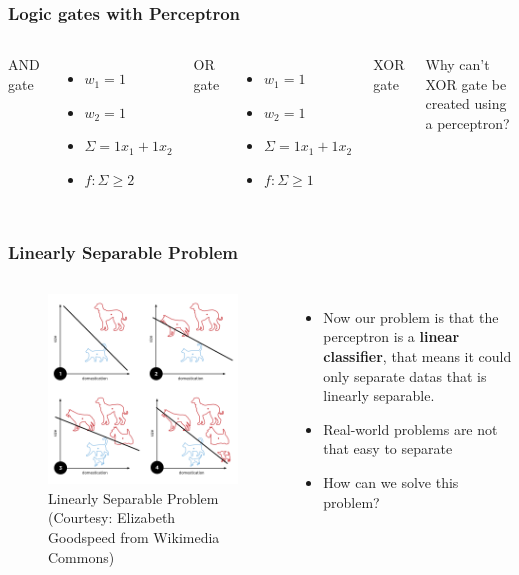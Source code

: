 \documentclass[aspectratio=169]{beamer}
\begin{document}
\begin{frame}
	\frametitle{Logic gates with Perceptron}
	\begin{columns}[t]
		{\large AND gate}

		\begin{itemize}
			\item $w_1 = 1$
			\item $w_2 = 1$
			\item $\Sigma = 1x_1 + 1x_2$
			\item $f: \Sigma \geq 2$
		\end{itemize}
		{\large OR gate}

		\begin{itemize}
			\item $w_1 = 1$
			\item $w_2 = 1$
			\item $\Sigma = 1x_1 + 1x_2$
			\item $f: \Sigma \geq 1$
		\end{itemize}
		{\large XOR gate}

		Why can't XOR gate be created using a perceptron?
	\end{columns}
\end{frame}

\begin{frame}
	\frametitle{Linearly Separable Problem}
	\begin{columns}
		\begin{figure}
			\includegraphics[width=0.7\linewidth,height=0.7\textheight,keepaspectratio]{imgs/linsep.png}
			\caption{Linearly Separable Problem (Courtesy: Elizabeth Goodspeed from Wikimedia Commons)}
		\end{figure}
		\begin{itemize}
			\item Now our problem is that the perceptron is a \textbf{linear classifier}, that means it could only separate datas that is linearly separable.
			\item Real-world problems are not that easy to separate
			\item How can we solve this problem?
		\end{itemize}
	\end{columns}
\end{frame}
\end{document}
